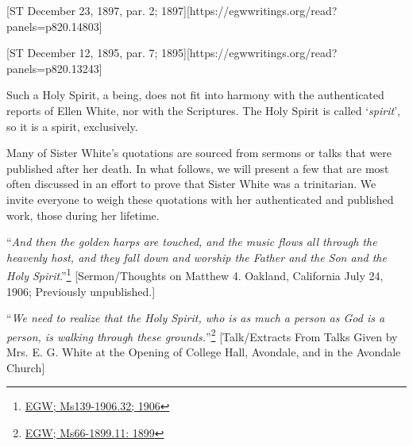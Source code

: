 [ST December 23, 1897, par. 2; 1897][https://egwwritings.org/read?panels=p820.14803]

[ST December 12, 1895, par. 7; 1895][https://egwwritings.org/read?panels=p820.13243]

Such a Holy Spirit, a being, does not fit into harmony with the authenticated reports of Ellen White, nor with the Scriptures. The Holy Spirit is called ‘\textit{spirit}’, so it is a spirit, exclusively.

Many of Sister White’s quotations are sourced from sermons or talks that were published after her death. In what follows, we will present a few that are most often discussed in an effort to prove that Sister White was a trinitarian. We invite everyone to weigh these quotations with her authenticated and published work, those during her lifetime.

“\textit{And then the golden harps are touched, and the music flows all through the heavenly host, and they fall down and worship the Father and the Son and the Holy Spirit}.”\footnote{\href{https://egwwritings.org/?ref=en_Ms139-1906.32&para=9579.38}{EGW; Ms139-1906.32; 1906}} [Sermon/Thoughts on Matthew 4. Oakland, California July 24, 1906; Previously unpublished.]

“\textit{We need to realize that the Holy Spirit, who is as much a person as God is a person, is walking through these grounds.}”\footnote{\href{https://egwwritings.org/?ref=en_Ms66-1899.11&para=6622.19}{EGW; Ms66-1899.11: 1899}} [Talk/Extracts From Talks Given by Mrs. E. G. White at the Opening of College Hall, Avondale, and in the Avondale Church]